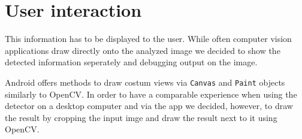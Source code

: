 	\section{User interaction}
	\label{android-ui}
	This information has to be displayed to the user. While often computer vision applications draw directly onto the analyzed image we decided to show the detected information seperately and debugging output on the image.

	Android offers methods to draw costum views via \texttt{Canvas} and \texttt{Paint} objects similarly to OpenCV. In order to have a comparable experience when using the detector on a desktop computer and via the app we decided, however, to draw the result by cropping the input imge and draw the result next to it using OpenCV.
